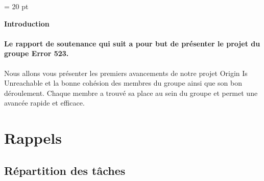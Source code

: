 \documentclass[12pt,a4paper]{article}
\begin{document}
\pagestyle{fancy}
\thispagestyle{empty}
\baselineskip = 20 pt
\newpage
{}

\begin{center}
\begin{Large}
\textbf{Introduction}
\end{Large}
\end{center}

  	\paragraph{		 Le rapport de soutenance qui suit a pour but de présenter le projet du groupe
Error 523.\newline} 

	Nous allons vous présenter les premiers avancements de notre projet Origin Is Unreachable et la bonne cohésion des membres du groupe ainsi que son bon déroulement. Chaque membre a trouvé sa place au sein du groupe et permet une avancée rapide et efficace.  
\newpage
\thispagestyle{empty}
\tableofcontents

\newpage
\section {Rappels}
\subsection{Répartition des tâches}
\end{document}
